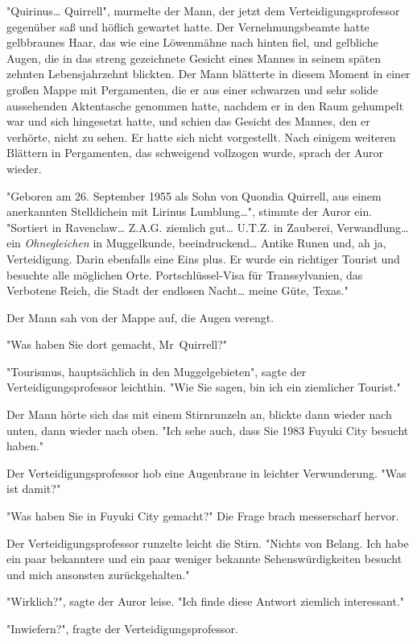 {"Quirinus… Quirrell", murmelte der Mann, der jetzt dem Verteidigungsprofessor gegenüber saß und höflich gewartet hatte. Der Vernehmungsbeamte hatte gelbbraunes Haar, das wie eine Löwenmähne nach hinten fiel, und gelbliche Augen, die in das streng gezeichnete Gesicht eines Mannes in seinem späten zehnten Lebensjahrzehnt blickten. Der Mann blätterte in diesem Moment in einer großen Mappe mit Pergamenten, die er aus einer schwarzen und sehr solide aussehenden Aktentasche genommen hatte, nachdem er in den Raum gehumpelt war und sich hingesetzt hatte, und schien das Gesicht des Mannes, den er verhörte, nicht zu sehen. Er hatte sich nicht vorgestellt. Nach einigem weiteren Blättern in Pergamenten, das schweigend vollzogen wurde, sprach der Auror wieder.

"Geboren am 26. September 1955 als Sohn von Quondia Quirrell, aus einem anerkannten Stelldichein mit Lirinus Lumblung…", stimmte der Auror ein. "Sortiert in Ravenclaw… Z.A.G. ziemlich gut… U.T.Z. in Zauberei, Verwandlung… ein \emph{Ohnegleichen} in Muggelkunde, beeindruckend… Antike Runen und, ah ja, Verteidigung. Darin ebenfalls eine Eins plus. Er wurde ein richtiger Tourist und besuchte alle möglichen Orte. Portschlüssel-Visa für Transsylvanien, das Verbotene Reich, die Stadt der endlosen Nacht… meine Güte, Texas."

Der Mann sah von der Mappe auf, die Augen verengt.

"Was haben Sie dort gemacht, Mr~Quirrell?"

"Tourismus, hauptsächlich in den Muggelgebieten", sagte der Verteidigungsprofessor leichthin. "Wie Sie sagen, bin ich ein ziemlicher Tourist."

Der Mann hörte sich das mit einem Stirnrunzeln an, blickte dann wieder nach unten, dann wieder nach oben. "Ich sehe auch, dass Sie 1983 Fuyuki City besucht haben."

Der Verteidigungsprofessor hob eine Augenbraue in leichter Verwunderung. "Was ist damit?"

"Was haben Sie in Fuyuki City gemacht?" Die Frage brach messerscharf hervor.

Der Verteidigungsprofessor runzelte leicht die Stirn. "Nichts von Belang. Ich habe ein paar bekanntere und ein paar weniger bekannte Sehenswürdigkeiten besucht und mich ansonsten zurückgehalten."

"Wirklich?", sagte der Auror leise. "Ich finde diese Antwort ziemlich interessant."

"Inwiefern?", fragte der Verteidigungsprofessor.

}
